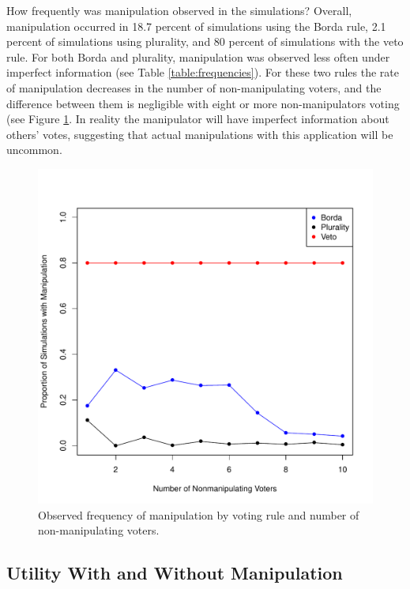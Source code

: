 \documentclass[12pt,letterpaper]{article} %
\begin{document}
How frequently was manipulation observed in the simulations? Overall, manipulation occurred in 18.7 percent of simulations using the Borda rule, 2.1 percent of simulations using plurality, and 80 percent of simulations with the veto rule. For both Borda and plurality, manipulation was observed less often under imperfect information (see Table \ref{table:frequencies}). For these two rules the rate of manipulation decreases in the number of non-manipulating voters, and the difference between them is negligible with eight or more non-manipulators voting (see Figure \ref{manipulation-frequency}. In reality the manipulator will have imperfect information about others' votes, suggesting that actual manipulations with this application will be uncommon. 



\begin{figure}[h!]
\begin{center}
\includegraphics[scale=0.4]{../graphics/manipulation-frequency.pdf}
\caption{Observed frequency of manipulation by voting rule and number of non-manipulating voters.}
\label{manipulation-frequency}
\end{center}
\end{figure}

\subsection{Utility With and Without Manipulation}
\end{document}
